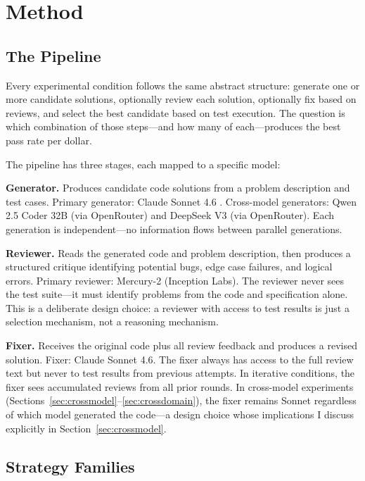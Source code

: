 \documentclass{article}
\begin{document}
\section{Method}
\label{sec:method}

\subsection{The Pipeline}

Every experimental condition follows the same abstract structure: generate one or more candidate solutions, optionally review each solution, optionally fix based on reviews, and select the best candidate based on test execution. The question is which combination of those steps---and how many of each---produces the best pass rate per dollar.

The pipeline has three stages, each mapped to a specific model:

\textbf{Generator.} Produces candidate code solutions from a problem description and test cases. Primary generator: Claude Sonnet 4.6 \citep{anthropic2025claude4}. Cross-model generators: Qwen 2.5 Coder 32B \citep{hui2024qwen25coder} (via OpenRouter) and DeepSeek V3 \citep{deepseek2024v3} (via OpenRouter). Each generation is independent---no information flows between parallel generations.

\textbf{Reviewer.} Reads the generated code and problem description, then produces a structured critique identifying potential bugs, edge case failures, and logical errors. Primary reviewer: Mercury-2 (Inception Labs). The reviewer never sees the test suite---it must identify problems from the code and specification alone. This is a deliberate design choice: a reviewer with access to test results is just a selection mechanism, not a reasoning mechanism.

\textbf{Fixer.} Receives the original code plus all review feedback and produces a revised solution. Fixer: Claude Sonnet 4.6. The fixer always has access to the full review text but never to test results from previous attempts. In iterative conditions, the fixer sees accumulated reviews from all prior rounds. In cross-model experiments (Sections~\ref{sec:crossmodel}--\ref{sec:crossdomain}), the fixer remains Sonnet regardless of which model generated the code---a design choice whose implications I discuss explicitly in Section~\ref{sec:crossmodel}.

\subsection{Strategy Families}
\end{document}
